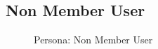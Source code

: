 \documentclass[12pt]{report}
\begin{document}
\subsection{Non Member User}
\begin{figure}[!htb]
	\caption{\label{fig:non_member_user}Persona: Non Member User}
\end{figure}

\FloatBarrier
\end{document}
